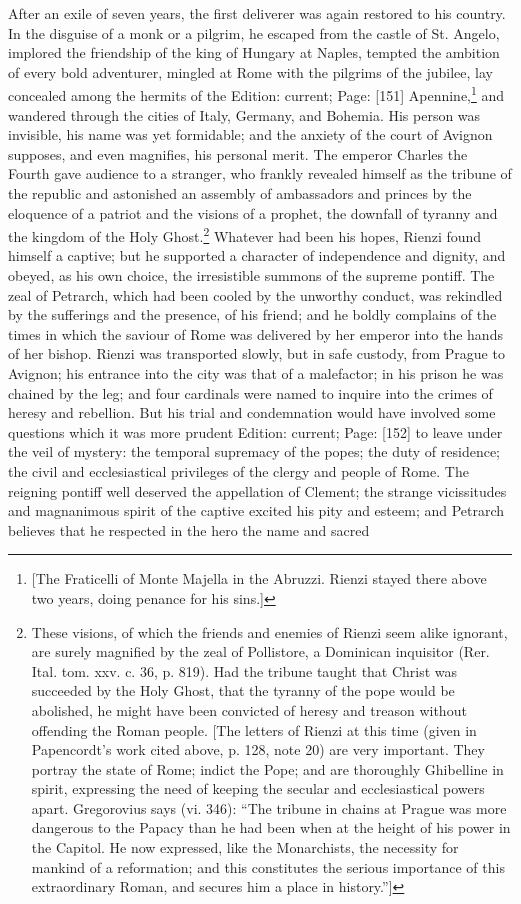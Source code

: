 After an exile of seven years, the first deliverer was again restored to his country. In the disguise of a monk or a pilgrim, he escaped from the castle of St. Angelo, implored the friendship of the king of Hungary at Naples, tempted the ambition of every bold adventurer, mingled at Rome with the pilgrims of the jubilee, lay concealed among the hermits of the Edition: current; Page: [151] Apennine,\footnote{[The Fraticelli of Monte Majella in the Abruzzi. Rienzi stayed there above two years, doing penance for his sins.]} and wandered through the cities of Italy, Germany, and Bohemia. His person was invisible, his name was yet formidable; and the anxiety of the court of Avignon supposes, and even magnifies, his personal merit. The emperor Charles the Fourth gave audience to a stranger, who frankly revealed himself as the tribune of the republic and astonished an assembly of ambassadors and princes by the eloquence of a patriot and the visions of a prophet, the downfall of tyranny and the kingdom of the Holy Ghost.\footnote{These visions, of which the friends and enemies of Rienzi seem alike ignorant, are surely magnified by the zeal of Pollistore, a Dominican inquisitor (Rer. Ital. tom. xxv. c. 36, p. 819). Had the tribune taught that Christ was succeeded by the Holy Ghost, that the tyranny of the pope would be abolished, he might have been convicted of heresy and treason without offending the Roman people. [The letters of Rienzi at this time (given in Papencordt\texthebrew{}’s work cited above, p. 128, note 20) are very important. They portray the state of Rome; indict the Pope; and are thoroughly Ghibelline in spirit, expressing the need of keeping the secular and ecclesiastical powers apart. Gregorovius says (vi. 346): \texthebrew{“}The tribune in chains at Prague was more dangerous to the Papacy than he had been when at the height of his power in the Capitol. He now expressed, like the Monarchists, the necessity for mankind of a reformation; and this constitutes the serious importance of this extraordinary Roman, and secures him a place in history.\texthebrew{}”]} Whatever had been his hopes, Rienzi found himself a captive; but he supported a character of independence and dignity, and obeyed, as his own choice, the irresistible summons of the supreme pontiff. The zeal of Petrarch, which had been cooled by the unworthy conduct, was rekindled by the sufferings and the presence, of his friend; and he boldly complains of the times in which the saviour of Rome was delivered by her emperor into the hands of her bishop. Rienzi was transported slowly, but in safe custody, from Prague to Avignon; his entrance into the city was that of a malefactor; in his prison he was chained by the leg; and four cardinals were named to inquire into the crimes of heresy and rebellion. But his trial and condemnation would have involved some questions which it was more prudent Edition: current; Page: [152] to leave under the veil of mystery: the temporal supremacy of the popes; the duty of residence; the civil and ecclesiastical privileges of the clergy and people of Rome. The reigning pontiff well deserved the appellation of Clement; the strange vicissitudes and magnanimous spirit of the captive excited his pity and esteem; and Petrarch believes that he respected in the hero the name and sacred 